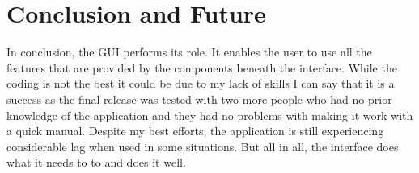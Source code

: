 \documentclass[11pt]{article} %
\begin{document}
\section{Conclusion and Future}

In conclusion, the GUI performs its role. It enables the user to use all the features that are provided by the components beneath the interface. While the coding is not the best it could be due to my lack of skills I can say that it is a success as the final release was tested with two more people who had no prior knowledge of the application and they had no problems with making it work with a quick manual. Despite my best efforts, the application is still experiencing considerable lag when used in some situations. But all in all, the interface does what it needs to to and does it well.







\end{document}
